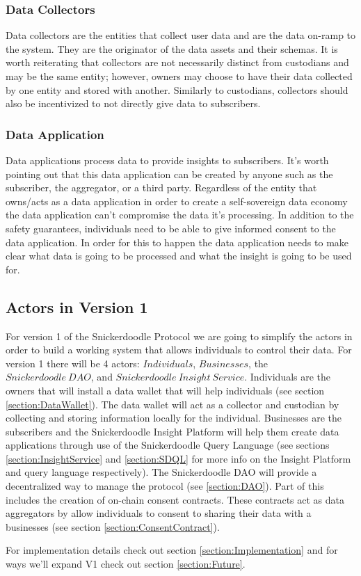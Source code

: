 \subsubsection{Data Collectors}
Data collectors are the entities that collect user data and are the data on-ramp to the system. They are the originator of the data assets and their schemas. It is worth reiterating that collectors are not necessarily distinct from custodians and may be the same entity; however, owners may choose to have their data collected by one entity and stored with another. Similarly to custodians, collectors should also be incentivized to not directly give data to subscribers.

\subsubsection{Data Application}
Data applications process data to provide insights to subscribers. It's worth pointing out that this data application can be created by anyone such as the subscriber, the aggregator, or a third party. Regardless of the entity that owns/acts as a data application in order to create a self-sovereign data economy the data application can't compromise the data it's processing. In addition to the safety guarantees, individuals need to be able to give informed consent to the data application. In order for this to happen the data application needs to make clear what data is going to be processed and what the insight is going to be used for.


\subsection{Actors in Version 1}
For version 1 of the Snickerdoodle Protocol we are going to simplify the actors in order to build a working system that allows individuals to control their data. For version 1 there will be 4 actors: $Individuals$, $Businesses$, the $Snickerdoodle\ DAO$, and $Snickerdoodle\ Insight\ Service$. 
Individuals are the owners that will install a data wallet that will help individuals (see section \ref{section:DataWallet}). The data wallet will act as a collector and custodian by collecting and storing information locally for the individual. 
Businesses are the subscribers and the Snickerdoodle Insight Platform will help them create data applications through use of the Snickerdoodle Query Language (see sections \ref{section:InsightService} and \ref{section:SDQL} for more info on the Insight Platform and query language respectively).
The Snickerdoodle DAO will provide a decentralized way to manage the protocol (see \ref{section:DAO}). Part of this includes the creation of on-chain consent contracts. These contracts act as data aggregators by allow individuals to consent to sharing their data with a businesses (see section \ref{section:ConsentContract}).

For implementation details check out section \ref{section:Implementation} and for ways we'll expand V1 check out section \ref{section:Future}.
